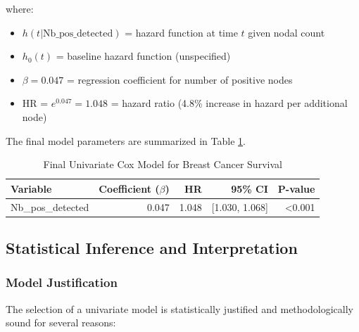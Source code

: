 \documentclass[12pt,a4paper]{article}
\begin{document}
where:
\begin{itemize}
    \item \(h(t|\text{Nb\_pos\_detected})\) = hazard function at time \(t\) given nodal count
    \item \(h_0(t)\) = baseline hazard function (unspecified)
    \item \(\beta = 0.047\) = regression coefficient for number of positive nodes
    \item HR = \(e^{0.047} = 1.048\) = hazard ratio (4.8\% increase in hazard per additional node)
\end{itemize}

The final model parameters are summarized in Table \ref{tab:final_model}.

\begin{table}[H]
\centering
\caption{Final Univariate Cox Model for Breast Cancer Survival}
\label{tab:final_model}
\begin{tabular}{lrrrr}
\toprule
\textbf{Variable} & \textbf{Coefficient ($\beta$)} & \textbf{HR} & \textbf{95\% CI} & \textbf{P-value} \\
\midrule
Nb\_pos\_detected & 0.047 & 1.048 & [1.030, 1.068] & <0.001 \\
\bottomrule
\end{tabular}
\end{table}

\subsection{Statistical Inference and Interpretation}

\subsubsection{Model Justification}

The selection of a univariate model is statistically justified and methodologically sound for several reasons:
\end{document}

